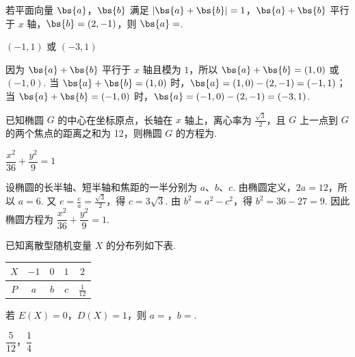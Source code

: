 \begin{problem}
若平面向量 \(\bs{a}\)，\(\bs{b}\) 满足 \(|\bs{a} + \bs{b}| = 1\)，\(\bs{a} + \bs{b}\) 平行于 \(x\) 轴，\(\bs{b} = (2, -1)\)，则 \(\bs{a} = \)\fillinblank{}.
\end{problem}

\begin{answer}
\((-1,1)\) 或 \((-3,1)\)
\end{answer}

\begin{solution}
因为 \(\bs{a}+\bs{b}\) 平行于 \(x\) 轴且模为 \(1\)，所以 \(\bs{a}+\bs{b}=(1,0)\) 或 \((-1,0)\). 当 \(\bs{a}+\bs{b}=(1,0)\) 时，\(\bs{a}=(1,0)-(2,-1)=(-1,1)\)；当 \(\bs{a}+\bs{b}=(-1,0)\) 时，\(\bs{a}=(-1,0)-(2,-1)=(-3,1)\).
\end{solution}

\begin{problem}
已知椭圆 \(G\) 的中心在坐标原点，长轴在 \(x\) 轴上，离心率为 \(\frac{\sqrt{3}}{2}\)，且 \(G\) 上一点到 \(G\) 的两个焦点的距离之和为 12，则椭圆 \(G\) 的方程为\fillinblank{}.
\end{problem}

\begin{answer}
\(\dfrac{x^2}{36}+\dfrac{y^2}{9}=1\)
\end{answer}

\begin{solution}
设椭圆的长半轴、短半轴和焦距的一半分别为 \(a\)、\(b\)、\(c\). 由椭圆定义，\(2a=12\)，所以 \(a=6\). 又 \(e=\frac ca=\frac{\sqrt3}{2}\)，得 \(c=3\sqrt3\). 由 \(b^2=a^2-c^2\)，得 \(b^2=36-27=9\). 因此椭圆方程为 \(\dfrac{x^2}{36}+\dfrac{y^2}{9}=1\).
\end{solution}

\begin{problem}
已知离散型随机变量 \(X\) 的分布列如下表.

\begin{center}
\begin{tabular}{c|cccc}
\hline
\(X\) & \(-1\) & \(0\) & \(1\) & \(2\) \\
\hline
\(P\) & \(a\) & \(b\) & \(c\) & \(\frac{1}{12}\) \\
\hline
\end{tabular}
\end{center}

若 \(E(X) = 0\)，\(D(X) = 1\)，则 \(a = \)\fillinblank{}，\(b = \)\fillinblank{}.
\end{problem}

\begin{answer}
\(\dfrac{5}{12}\)，\(\dfrac{1}{4}\)
\end{answer}

